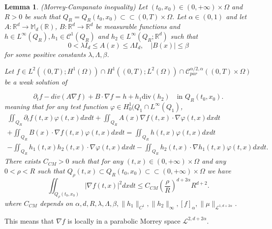 \documentclass[reqno,12pt,twoside]{amsart}
\newtheorem{lemma}{Lemma}[section]
\numberwithin{equation}{section} \numberwithin{theorem}{section}
\numberwithin{proposition}{section} \numberwithin{lemma}{section}
\numberwithin{corollary}{section}
\numberwithin{definition}{section} \numberwithin{remark}{section}
\begin{document}
\begin{lemma}\label{prop:grad_spat_Morrey}(Morrey-Campanato inequality)
Let $(t_0, x_0) \in (0, +\infty) \times \Omega$ and $R >0$ be such that $Q_R =Q_R(t_0,x_0) \subset \subset (0,T) \times \Omega$. Let $\alpha \in (0,1)$ and let $A : \mathbb{R}^d  \rightarrow \mathbb{M}_d(\mathbb{R})$, $B : \mathbb{R}^d \rightarrow \mathbb{R}^d$ be measurable functions and $h \in L^{\infty}(Q_R), h_1 \in \mathcal{C}^1(Q_R)$ and $h_2 \in L^\infty (Q_R ;\mathbb{R}^d)$ such that 
\[0< \lambda I_d \leqslant A(x) \leqslant \Lambda I_d, \quad |B(x)| \leqslant \beta\]
for some positive constants $\lambda, \Lambda, \beta$.  

\smallskip

Let $f \in L^2((0,T); H^1(\Omega))\cap H^1((0,T); L^2(\Omega)) \cap \mathcal{C}_{par}^{\alpha/2, \alpha}((0,T)\times \Omega)$ be a weak solution of

\begin{equation}
\partial_t f - div(A\nabla f) + B \cdot \nabla f= h + h_1 \text{div}(h_2) \quad \text{in } Q_R(t_0,x_0).
\end{equation}
meaning that for any test function $\varphi \in H_0^1(Q_1 \cap L^\infty(Q_1)$, 
\begin{multline}\label{eq : f campanato}
\iint_{Q_R} \partial_t f(t,x) \varphi(t,x) dxdt + \iint_{Q_R}A(x)\nabla f(t,x)\cdot \nabla \varphi(t,x) dxdt\\ + \iint_{Q_R}B(x)\cdot\nabla f(t,x) \varphi(t,x) dxdt
= \iint_{Q_R} h(t,x) \varphi(t,x) dxdt\\ -\iint_{Q_R} h_1(t,x) h_2(t,x) \cdot \nabla \varphi(t,x) dxdt - \iint_{Q_R} h_2(t,x)\cdot \nabla h_1(t,x) \varphi(t,x) dxdt. 
\end{multline}
There exists \(C_{CM} >0\) such that for any \( (t,x)\in (0,+\infty)\times \Omega\) and any \(0<\rho<R\) such that \( Q_\rho(t,x)\subset Q_R(t_0,x_0) \subset \subset (0,+\infty)\times \Omega\) we have
\begin{equation}\label{eq:decroissance}
\iint_{Q_\rho(t_0,x_0)} |\nabla f(t,x)|^2 dxdt \leqslant C_{CM} \left(\frac{\rho}{R} \right)^{d+2\alpha} R^{d+2}.
\end{equation}
where \(C_{CM}\) depends on \(\alpha,d, R, \lambda, \Lambda, \beta, \|h_1\|_{C^1}, \|h_2\|_\infty, [f]_{\alpha}, \|\mu\|_{\mathcal{L}^{1,d+2\alpha}}\).
\end{lemma}

This means that \(\nabla f\) is locally in a parabolic Morrey space \(\mathcal{L}^{2,d+2\alpha}\). 
\end{document}

